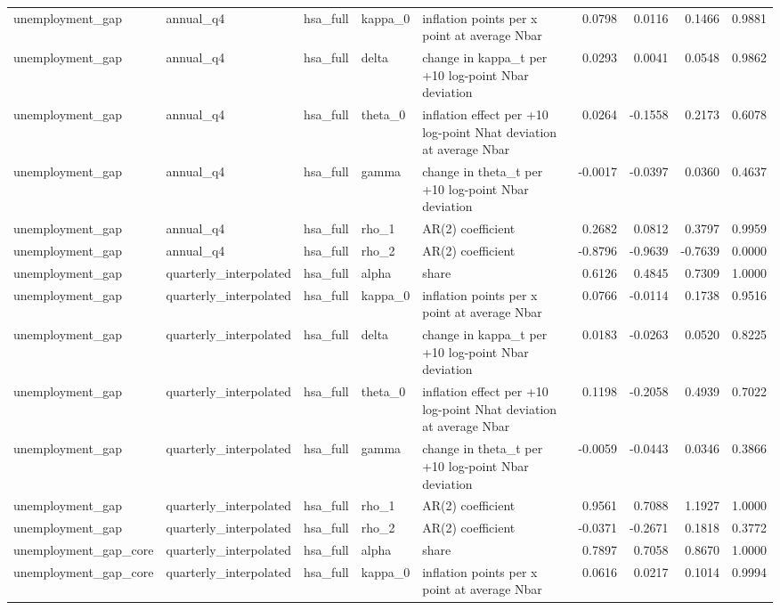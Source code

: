 \begin{tabular}{lllllrrrr}
unemployment\_gap & annual\_q4 & hsa\_full & kappa\_0 & inflation points per x point at average Nbar & 0.0798 & 0.0116 & 0.1466 & 0.9881 \\
unemployment\_gap & annual\_q4 & hsa\_full & delta & change in kappa\_t per +10 log-point Nbar deviation & 0.0293 & 0.0041 & 0.0548 & 0.9862 \\
unemployment\_gap & annual\_q4 & hsa\_full & theta\_0 & inflation effect per +10 log-point Nhat deviation at average Nbar & 0.0264 & -0.1558 & 0.2173 & 0.6078 \\
unemployment\_gap & annual\_q4 & hsa\_full & gamma & change in theta\_t per +10 log-point Nbar deviation & -0.0017 & -0.0397 & 0.0360 & 0.4637 \\
unemployment\_gap & annual\_q4 & hsa\_full & rho\_1 & AR(2) coefficient & 0.2682 & 0.0812 & 0.3797 & 0.9959 \\
unemployment\_gap & annual\_q4 & hsa\_full & rho\_2 & AR(2) coefficient & -0.8796 & -0.9639 & -0.7639 & 0.0000 \\
unemployment\_gap & quarterly\_interpolated & hsa\_full & alpha & share & 0.6126 & 0.4845 & 0.7309 & 1.0000 \\
unemployment\_gap & quarterly\_interpolated & hsa\_full & kappa\_0 & inflation points per x point at average Nbar & 0.0766 & -0.0114 & 0.1738 & 0.9516 \\
unemployment\_gap & quarterly\_interpolated & hsa\_full & delta & change in kappa\_t per +10 log-point Nbar deviation & 0.0183 & -0.0263 & 0.0520 & 0.8225 \\
unemployment\_gap & quarterly\_interpolated & hsa\_full & theta\_0 & inflation effect per +10 log-point Nhat deviation at average Nbar & 0.1198 & -0.2058 & 0.4939 & 0.7022 \\
unemployment\_gap & quarterly\_interpolated & hsa\_full & gamma & change in theta\_t per +10 log-point Nbar deviation & -0.0059 & -0.0443 & 0.0346 & 0.3866 \\
unemployment\_gap & quarterly\_interpolated & hsa\_full & rho\_1 & AR(2) coefficient & 0.9561 & 0.7088 & 1.1927 & 1.0000 \\
unemployment\_gap & quarterly\_interpolated & hsa\_full & rho\_2 & AR(2) coefficient & -0.0371 & -0.2671 & 0.1818 & 0.3772 \\
unemployment\_gap\_core & quarterly\_interpolated & hsa\_full & alpha & share & 0.7897 & 0.7058 & 0.8670 & 1.0000 \\
unemployment\_gap\_core & quarterly\_interpolated & hsa\_full & kappa\_0 & inflation points per x point at average Nbar & 0.0616 & 0.0217 & 0.1014 & 0.9994 \\

\end{tabular}

